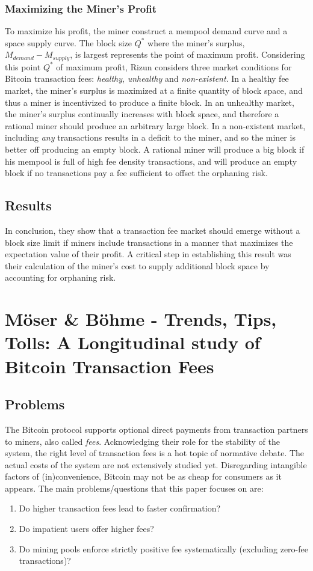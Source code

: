 \documentclass[USenglish]{uit-thesis}
\begin{document}
\subsubsection{Maximizing the Miner's Profit}
To maximize his profit, the miner construct a mempool
demand curve and a space supply curve.
The block size $Q^*$ where the miner's surplus,
$M_{demand} - M_{supply}$, is largest represents
the point of maximum profit. Considering this point $Q^*$ of maximum
profit, Rizun considers three market conditions for Bitcoin transaction
fees: \emph{healthy}, \emph{unhealthy} and \emph{non-existent}.
In a healthy fee market, the miner's surplus is maximized
at a finite quantity of block space, and thus a miner is
incentivized to produce a finite block. In an unhealthy
market, the miner's surplus continually increases with
block space, and therefore a rational miner should produce
an arbitrary large block. In a non-existent market,
including \emph{any} transactions results in a deficit
to the miner, and so the miner is better off
producing an empty block. A rational
miner will produce a big block if his mempool
is full of high fee density transactions, and
will produce an empty block if no transactions pay a fee sufficient
to offset the orphaning risk.

\subsection{Results}
In conclusion, they show that a transaction fee market should
emerge without a block size limit if miners
include transactions in a manner that maximizes
the expectation value of their profit. A
critical step in establishing this result was their
calculation of the miner’s cost to supply
additional block space by accounting for orphaning risk.

\section{Möser \& Böhme - Trends, Tips, Tolls: A Longitudinal
study of Bitcoin Transaction Fees}
\label{sec:moser}
\subsection{Problems}
The Bitcoin protocol supports optional direct payments
from transaction partners to miners, also called \emph{fees}.
Acknowledging their
role for the stability of the system, the right level of
transaction fees is a hot topic of normative debate. The actual
costs of the system are not extensively studied yet. Disregarding
intangible factors of (in)convenience, Bitcoin may not be as cheap for
consumers as it appears. The main problems/questions
that this paper focuses on are:
\begin{enumerate}[noitemsep]
	\item Do higher transaction fees lead to faster confirmation?
	\item Do impatient users offer higher fees?
	\item Do mining pools enforce strictly positive fee systematically
	(excluding zero-fee transactions)?
\end{enumerate}
\end{document}
